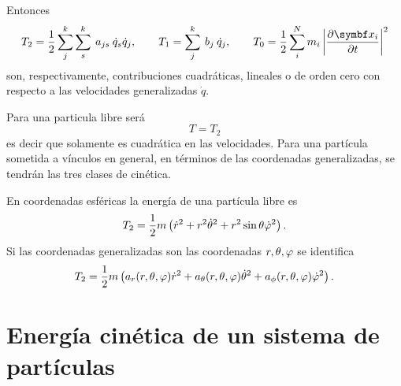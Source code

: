 \documentclass[10pt,oneside]{CBFT_book}
\begin{document}
Entonces
\[
	T_2 = \frac{1}{2} \sum_j^{k} \sum_s^{k} \: a_{js} \: \dot{q}_s\dot{q}_j, \qquad 
	T_1 = \sum_j^{k} \: b_j \: \dot{q}_j , \qquad 
	T_0 = \frac{1}{2} \sum_i^N m_i \left| \dpar{\vb{x}_i}{t} \right|^2
\]
son, respectivamente, contribuciones cuadráticas, lineales o de orden cero con respecto a las velocidades generalizadas $\dot{q}$.
% 

Para una particula libre será
\[
	T = T_2
\]
es decir que solamente es cuadrática en las velocidades. Para una partícula sometida a vínculos en general, en términos
de las coordenadas generalizadas, se tendrán las tres clases de cinética.

En coordenadas esféricas la energía de una partícula libre es 
\[
	T_2 =  \frac{1}{2} m \left( \dot{r}^2 + r^2 \dot{\theta}^2 + r^2 \sin \theta \dot{\varphi}^2 \right).
\]
Si las coordenadas generalizadas son las coordenadas $ r, \theta, \varphi $ se identifica 
\[
	T_2 =  \frac{1}{2} m \left( a_r(r, \theta, \varphi ) \dot{r}^2 + a_\theta(r, \theta, \varphi ) \dot{\theta}^2 + 
	a_\phi(r, \theta, \varphi ) \dot{\varphi}^2 \right).
\]

\section{Energía cinética de un sistema de partículas}
\end{document}
